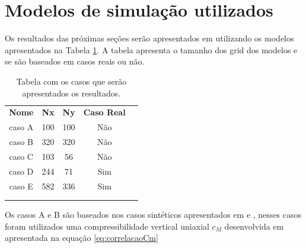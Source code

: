 \section{Modelos de simulação utilizados}

Os resultados das próximas seções serão apresentados em utilizando os modelos apresentados na Tabela \ref{tab:descricaoModelos}. 
A tabela apresenta o tamanho dos grid dos modelos e se são baseados em casos reais ou não.


\begin{table}[]
    \caption{Tabela com os casos que serão apresentados os resultados. }\label{tab:descricaoModelos}
    \centering
    \begin{tabular}{ccccl}
    \cline{1-4}
    \multicolumn{1}{|c|}{\textbf{Nome}} & \multicolumn{1}{c|}{\textbf{Nx}} & \multicolumn{1}{c|}{\textbf{Ny}} & \multicolumn{1}{c|}{\textbf{Caso Real}} &  \\ \cline{1-4}
    \multicolumn{1}{|c|}{caso A}        & \multicolumn{1}{c|}{100}         & \multicolumn{1}{c|}{100}         & \multicolumn{1}{c|}{Não}                   &  \\ \cline{1-4}
    \multicolumn{1}{|c|}{caso B}        & \multicolumn{1}{c|}{320}         & \multicolumn{1}{c|}{320}         & \multicolumn{1}{c|}{Não}                   &  \\ \cline{1-4}
    \multicolumn{1}{|c|}{caso C}        & \multicolumn{1}{c|}{103}         & \multicolumn{1}{c|}{56}          & \multicolumn{1}{c|}{Não}                   &  \\ \cline{1-4}
    \multicolumn{1}{|c|}{caso D}        & \multicolumn{1}{c|}{244}         & \multicolumn{1}{c|}{71}          & \multicolumn{1}{c|}{Sim}                &  \\ \cline{1-4}
    \multicolumn{1}{|c|}{caso E}        & \multicolumn{1}{c|}{582}         & \multicolumn{1}{c|}{336}         & \multicolumn{1}{c|}{Sim}                &  \\ \cline{1-4}
    \multicolumn{1}{l}{}                & \multicolumn{1}{l}{}             & \multicolumn{1}{l}{}             & \multicolumn{1}{l}{}                    &  \\
    \multicolumn{1}{l}{}                & \multicolumn{1}{l}{}             & \multicolumn{1}{l}{}             & \multicolumn{1}{l}{}                    & 
    \end{tabular}
\end{table}


Os casos A e B são baseados nos casos sintéticos apresentados em \cite{casteletto} e \cite{irina}, nesses casos foram utilizados
uma compressibilidade vertical uniaxial $c_M$ desenvolvida em \cite{correlacaoE} apresentada na equação \ref{eq:correlacaoCm}

